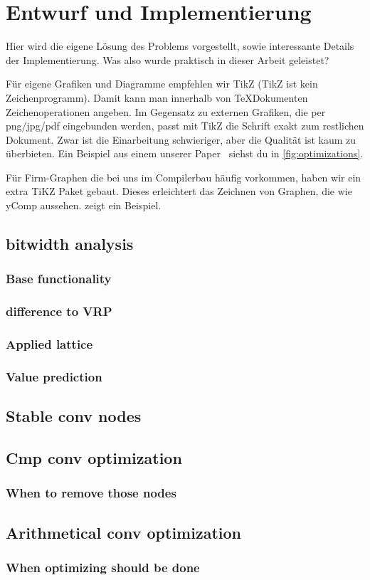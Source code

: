 \chapter{Entwurf und Implementierung}\label{sec:impl}

Hier wird die eigene Lösung des Problems vorgestellt,
sowie interessante Details der Implementierung.
Was also wurde praktisch in dieser Arbeit geleistet?



Für eigene Grafiken und Diagramme empfehlen wir TikZ
(TikZ ist kein Zeichenprogramm).
Damit kann man innerhalb von \TeX Dokumenten Zeichenoperationen angeben.
Im Gegensatz zu externen Grafiken,
die per png/jpg/pdf eingebunden werden,
passt mit TikZ die Schrift exakt zum restlichen Dokument.
Zwar ist die Einarbeitung schwieriger,
aber die Qualität ist kaum zu überbieten.
Ein Beispiel aus einem unserer Paper~\cite{braun13cc}
siehst du in \cref{fig:optimizations}.



Für Firm-Graphen die bei uns im Compilerbau häufig vorkommen,
haben wir ein extra TiKZ Paket gebaut.
Dieses erleichtert das Zeichnen von Graphen,
die wie yComp aussehen.
 zeigt ein Beispiel.

\section{bitwidth analysis}
\subsection{Base functionality}
\subsection{difference to VRP}
\subsection{Applied lattice}
\subsection{Value prediction}

\section{Stable conv nodes}

\section{Cmp conv optimization}
\subsection{When to remove those nodes}

\section{Arithmetical conv optimization}
\subsection{When optimizing should be done}